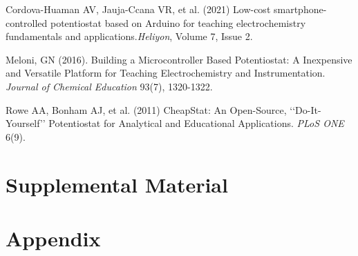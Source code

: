 \documentclass{article}
\begin{document}
Cordova-Huaman AV, Jauja-Ccana VR, et al. (2021) Low-cost smartphone-controlled potentiostat based on Arduino for teaching electrochemistry fundamentals and applications.\emph{Heliyon}, Volume 7, Issue 2. 

Meloni, GN (2016). Building a Microcontroller Based Potentiostat: A Inexpensive and Versatile Platform for Teaching Electrochemistry and Instrumentation. \emph{Journal of Chemical Education} 93(7), 1320-1322. 

Rowe AA, Bonham AJ, et al. (2011) CheapStat: An Open-Source, ‘‘Do-It-Yourself’’ Potentiostat for Analytical and Educational Applications. \emph{PLoS ONE} 6(9).

\newpage
\section*{Supplemental Material}

\newpage
\section*{Appendix}
\end{document}
